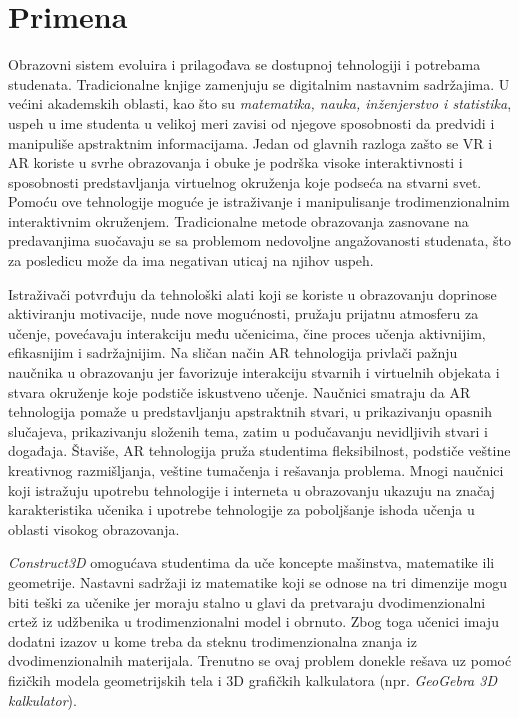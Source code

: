 \documentclass[a4paper]{article}
\begin{document}
	\section{Primena}
	\label{sec:Primena}
	Obrazovni sistem evoluira i prilagođava se dostupnoj tehnologiji i potrebama studenata. Tradicionalne knjige zamenjuju se digitalnim nastavnim sadržajima. 
	U većini akademskih oblasti, kao što su \emph{matematika, nauka, inženjerstvo i statistika}, uspeh u ime studenta u velikoj meri zavisi od njegove sposobnosti da 
	predvidi i manipuliše apstraktnim informacijama. Jedan od glavnih razloga zašto se VR i AR koriste u svrhe obrazovanja i obuke je podrška visoke interaktivnosti 
	i sposobnosti predstavljanja virtuelnog okruženja koje podseća na stvarni svet. Pomoću ove tehnologije moguće je istraživanje i manipulisanje trodimenzionalnim 
	interaktivnim okruženjem. Tradicionalne metode obrazovanja zasnovane na predavanjima suočavaju se sa problemom nedovoljne  angažovanosti studenata, što za posledicu 
	može da ima negativan uticaj na njihov uspeh.


	Istraživači potvrđuju da tehnološki alati koji se koriste u obrazovanju doprinose aktiviranju motivacije, nude nove mogućnosti, pružaju prijatnu atmosferu za učenje, 
	povećavaju interakciju među učenicima, čine proces učenja aktivnijim, efikasnijim i sadržajnijim. Na sličan način AR tehnologija privlači pažnju naučnika u obrazovanju 
	jer favorizuje interakciju stvarnih i virtuelnih objekata i stvara okruženje koje podstiče iskustveno učenje. Naučnici smatraju da AR tehnologija pomaže u predstavljanju 
	apstraktnih stvari, u prikazivanju opasnih slučajeva, prikazivanju složenih tema, zatim u podučavanju nevidljivih stvari i događaja. Štaviše, AR tehnologija pruža studentima 
	fleksibilnost, podstiče veštine kreativnog razmišljanja, veštine tumačenja i rešavanja problema. Mnogi naučnici koji istražuju upotrebu tehnologije i interneta u obrazovanju 
	ukazuju na značaj karakteristika učenika i upotrebe tehnologije za poboljšanje ishoda učenja u oblasti visokog obrazovanja.

	\emph{Construct3D} omogućava studentima da uče koncepte mašinstva, matematike ili geometrije. Nastavni sadržaji iz matematike koji se odnose na tri dimenzije mogu biti teški za učenike 
	jer moraju stalno u glavi da pretvaraju dvodimenzionalni crtež iz udžbenika u trodimenzionalni model i obrnuto. Zbog toga učenici imaju dodatni izazov u kome treba da steknu 
	trodimenzionalna znanja iz dvodimenzionalnih materijala. Trenutno se ovaj problem donekle rešava uz pomoć fizičkih modela geometrijskih tela i 3D grafičkih kalkulatora (npr. \emph{GeoGebra 3D kalkulator}).
	
\end{document}
